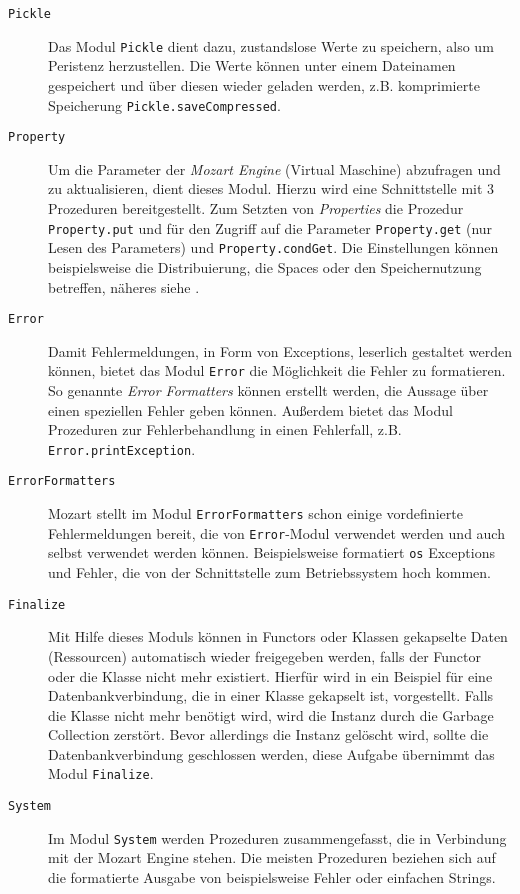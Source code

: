 \begin{description}
  \item[\texttt{Pickle}] Das Modul \texttt{Pickle} dient dazu, zustandslose
  Werte zu speichern, also um Peristenz herzustellen. Die Werte können unter
  einem Dateinamen gespeichert und über diesen wieder geladen werden, z.B.
  komprimierte Speicherung \texttt{Pickle.save\-Compressed}.
  
  \item[\texttt{Property}] Um die Parameter der \textsl{Mozart Engine} (Virtual
  Maschine) abzufragen und zu aktualisieren, dient dieses Modul. Hierzu wird
  eine Schnittstelle mit 3 Prozeduren bereitgestellt. Zum Setzten von
  \textsl{Properties} die Prozedur \texttt{Property.put} und für den Zugriff
  auf die Parameter \texttt{Property.get} (nur Lesen des Parameters) und
  \texttt{Property.condGet}. Die Einstellungen können beispielsweise die
  Distribuierung, die Spaces oder den Speichernutzung betreffen, näheres siehe
  \cite[System Modules, Part V]{url:mozart-documentation}.
  
  \item[\texttt{Error}] Damit Fehlermeldungen, in Form von Exceptions, leserlich
  gestaltet werden können, bietet das Modul \texttt{Error} die Möglichkeit die
  Fehler zu formatieren. So genannte \textsl{Error Formatters} können erstellt
  werden, die Aussage über einen speziellen Fehler geben können. Außerdem bietet
  das Modul Prozeduren zur Fehlerbehandlung in einen Fehlerfall, z.B.
  \texttt{Error.printException}. 
  
  \item[\texttt{ErrorFormatters}] Mozart stellt im Modul
  \texttt{ErrorFormatters} schon einige vordefinierte Fehlermeldungen bereit,
  die von \texttt{Error}-Modul verwendet werden und auch selbst verwendet
  werden können. Beispielsweise formatiert \texttt{os} Exceptions und Fehler,
  die von der Schnittstelle zum Betriebssystem hoch kommen.  
  
  \item[\texttt{Finalize}] Mit Hilfe dieses Moduls können in Functors oder
  Klassen gekapselte Daten (Ressourcen) automatisch wieder freigegeben werden,
  falls der Functor oder die Klasse nicht mehr existiert. Hierfür wird in
  \cite[System Modules, Part V]{url:mozart-documentation} ein Beispiel für eine
  Datenbankverbindung, die
  in einer Klasse gekapselt ist, vorgestellt. Falls die Klasse nicht mehr
  benötigt wird, wird die Instanz durch die Garbage Collection zerstört. Bevor
  allerdings die Instanz gelöscht wird, sollte die Datenbankverbindung
  geschlossen werden, diese Aufgabe übernimmt das Modul \texttt{Finalize}.
  
  \item[\texttt{System}] Im Modul \texttt{System} werden Prozeduren
  zusammengefasst, die in Verbindung mit der Mozart Engine stehen. Die meisten
  Prozeduren beziehen sich auf die formatierte Ausgabe von beispielsweise
  Fehler oder einfachen Strings.
\end{description} 

